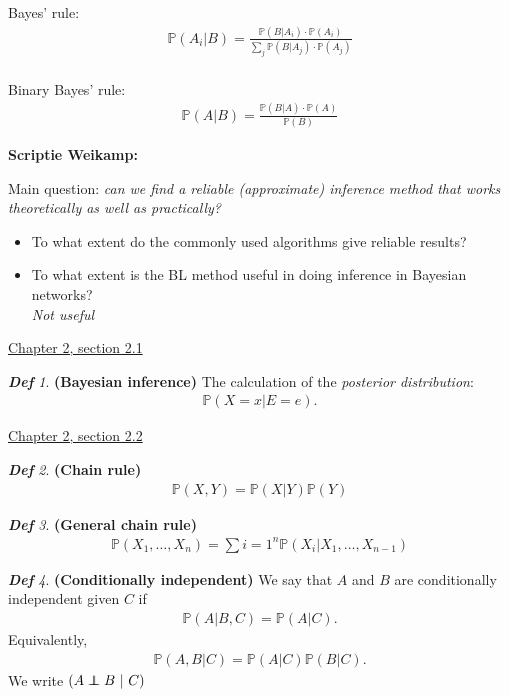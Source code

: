 \documentclass{amsart}
\newcommand\indep{\protect\mathpalette{\protect\independenT}{\perp}}
\def\independenT#1#2{\mathrel{\rlap{$#1#2$}\mkern2mu{#1#2}}}
\theoremstyle{plain}
\theoremstyle{remark}
\newtheorem*{definition*}{\textbf{\em Def}}
\theoremstyle{plain}
\renewcommand{\P}{{\mathbb P}}
\newcommand{\vs}{\vspace{0.75pc}}
\begin{document}
Bayes' rule:
\begin{align*}
\P(A_i|B) = \frac{\P(B|A_i) \cdot \P(A_i)}{\sum_j \P(B|A_j) \cdot \P(A_j)}
\end{align*}\\
Binary Bayes' rule:
\begin{align*}
\P(A|B) = \frac{\P(B|A) \cdot \P(A)}{ \P(B)}
\end{align*} \vs

\textbf{Scriptie Weikamp:}\vs

Main question: \textit{can we find a reliable (approximate) inference method that works theoretically as well as practically?} \\
\begin{itemize}
\item To what extent do the commonly used algorithms give reliable results?
\item To what extent is the BL method useful in doing inference in Bayesian networks? \\ \textit{Not useful}
\end{itemize}\vs

\underline{Chapter 2, section 2.1} \vs

\begin{definition*}\textbf{(Bayesian inference)}
The calculation of the \textit{posterior distribution}:
\begin{align*}
\P(X = x | E = e).
\end{align*}
\end{definition*}\vs

\underline{Chapter 2, section 2.2} \\
\begin{definition*}\textbf{(Chain rule)}
\begin{align*}
\P(X, Y) = \P(X | Y) \P(Y)
\end{align*}
\end{definition*}\vs

\begin{definition*}\textbf{ (General chain rule) }
\begin{align*}
\P(X_1, \ldots, X_n) = \sum{i=1}^n \P(X_i | X_1, \ldots , X_{n-1})
\end{align*}
\end{definition*}\vs

\begin{definition*}\textbf{(Conditionally independent)}
We say that $A$ and $B$ are conditionally independent given $C$ if
\begin{align*}
\P(A | B,C) = \P(A | C).
\end{align*}
Equivalently,
\begin{align*}
\P(A, B | C) = \P(A | C)\P(B| C).
\end{align*}
We write $(A \indep B\ |\ C)$
\end{definition*}\vs
\end{document}

